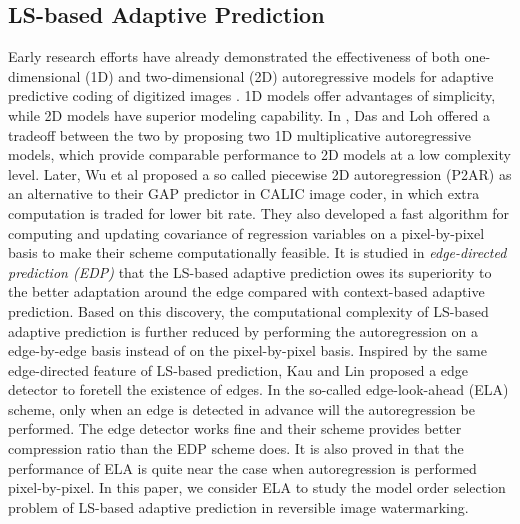 \documentclass[journal]{IEEEtran}
\begin{document}
\subsection{LS-based Adaptive Prediction}\label{sub:lsap}

Early research efforts have already demonstrated the effectiveness of both one-dimensional (1D) and
two-dimensional (2D) autoregressive models for adaptive predictive coding of digitized images
\cite{ic81review,Maragos84auto}. 1D models offer advantages of simplicity, while 2D models have
superior modeling capability. In \cite{Das92auto}, Das and Loh offered a tradeoff between the two by
proposing two 1D multiplicative autoregressive models, which provide comparable performance to 2D
models at a low complexity level. Later, Wu et al \cite{Wu98icip} proposed a so called piecewise 2D
autoregression (P2AR) as an alternative to their GAP predictor in CALIC image
coder\cite{Wu97calic2}, in which extra computation is traded for lower bit rate. They also developed
a fast algorithm for computing and updating covariance of regression variables on a pixel-by-pixel
basis to make their scheme computationally feasible. It is studied in \emph{edge-directed prediction
(EDP)} \cite{Li01edp} that the LS-based adaptive prediction owes its superiority to the better
adaptation around the edge compared with context-based adaptive prediction. Based on this discovery,
the computational complexity of LS-based adaptive prediction is further reduced by performing the
autoregression on a edge-by-edge basis instead of on the pixel-by-pixel basis.  Inspired by the same
edge-directed feature of LS-based prediction, Kau and Lin \cite{Kau05lsap} proposed a edge detector
to foretell the existence of edges. In the so-called edge-look-ahead (ELA) scheme, only when an edge
is detected in advance will the autoregression be performed. The edge detector works fine and their
scheme provides better compression ratio than the EDP scheme does. It is also proved in
\cite{Kau05lsap} that the performance of ELA is quite near the case when autoregression is performed
pixel-by-pixel. In this paper, we consider ELA to study the model order selection problem of
LS-based adaptive prediction in reversible image watermarking.
\end{document}
